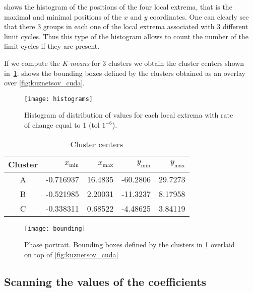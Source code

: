  shows the histogram of the positions of the four local extrema, that is the maximal and minimal positions of the $x$ and $y$ coordinates.
One can clearly see that there 3 groups in each one of the local extrema associated with 3 different limit cycles.
Thus this type of the histogram allows to count the number of the limit cycles if they are present.

If we compute the \emph{K-means} for 3 clusters we obtain the cluster centers shown in~\cref{tab:clusters}.  shows the bounding boxes defined by the clusters obtained as an overlay over \cref{fig:kuznetsov_cuda}.

\begin{figure}[H]
    \centering
    \texttt{[image: histograms]}
    \caption[Distribution values for local extrema]%
    {Histogram of distribution of values for each local extrema with rate of
        change equal to 1 (tol $1^{-6}$).
    }%
    \label{fig:histograms}
\end{figure}

\begin{table}[H]
    \centering
    \caption{Cluster centers}%
    \label{tab:clusters}
    \begin{tabular}{crrrr}
        \toprule
        Cluster & $x_{\min}$ & $x_{\max}$ & $y_{\min}$ & $y_{\max}$ \\ \midrule
        A & -0.716937 & 16.4835  & -60.2806  & 29.7273 \\
        B & -0.521985 &  2.20031 & -11.3237  &  8.17958 \\
        C & -0.338311 &  0.68522 &  -4.48625 &  3.84119 \\
        \bottomrule
    \end{tabular}
\end{table}

\begin{figure}[H]
    \centering
    \texttt{[image: bounding]}
    \caption{Phase portrait. Bounding boxes defined by the clusters in \cref{tab:clusters} overlaid on top of \cref{fig:kuznetsov_cuda}
    }%
    \label{fig:bounding}
\end{figure}

\pagebreak
\subsection{Scanning the values of the coefficients}

